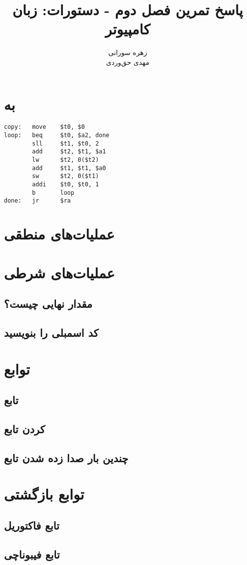\documentclass[11pt, dvipsnames, svgnames, x11names]{article}
\title{پاسخ تمرین فصل دوم - دستورات: زبان کامپیوتر}
\author{
    زهره سورانی \\
    مهدی‌ حق‌وردی}
\date{}
\begin{document}
\maketitle
\tableofcontents
\newpage
\section{ به }
\begin{latin}
\begin{lstlisting}[keywords={move, beq, sll, add, lw, sw, addi, b, jr}]
copy:   move    $t0, $0
loop:   beq     $t0, $a2, done
        sll     $t1, $t0, 2
        add     $t2, $t1, $a1
        lw      $t2, 0($t2)
        add     $t1, $t1, $a0
        sw      $t2, 0($t1)
        addi    $t0, $t0, 1
        b       loop
done:   jr      $ra
\end{lstlisting}
\end{latin}

\section{عملیات‌های منطقی}

\section{عملیات‌های شرطی }

\subsection{مقدار نهایی چیست؟}

\subsection{کد اسمبلی را بنویسید}

\section{توابع}

\subsection{تابع }

\subsection{ کردن تابع}

\subsection{چندین بار صدا زده شدن تابع}

\section{توابع بازگشتی}

\subsection{تابع فاکتوریل}

\subsection{تابع فیبوناچی}
\end{document}
